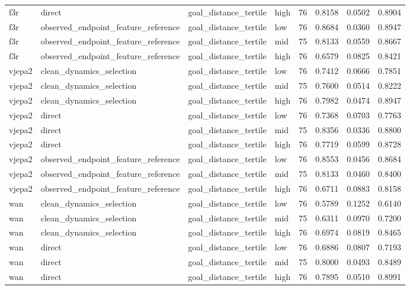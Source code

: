 \begin{tabular}{llllrrrr}
f3r & direct & goal\_distance\_tertile & high & 76 & 0.8158 & 0.0502 & 0.8904 \\
f3r & observed\_endpoint\_feature\_reference & goal\_distance\_tertile & low & 76 & 0.8684 & 0.0360 & 0.8947 \\
f3r & observed\_endpoint\_feature\_reference & goal\_distance\_tertile & mid & 75 & 0.8133 & 0.0559 & 0.8667 \\
f3r & observed\_endpoint\_feature\_reference & goal\_distance\_tertile & high & 76 & 0.6579 & 0.0825 & 0.8421 \\
vjepa2 & clean\_dynamics\_selection & goal\_distance\_tertile & low & 76 & 0.7412 & 0.0666 & 0.7851 \\
vjepa2 & clean\_dynamics\_selection & goal\_distance\_tertile & mid & 75 & 0.7600 & 0.0514 & 0.8222 \\
vjepa2 & clean\_dynamics\_selection & goal\_distance\_tertile & high & 76 & 0.7982 & 0.0474 & 0.8947 \\
vjepa2 & direct & goal\_distance\_tertile & low & 76 & 0.7368 & 0.0703 & 0.7763 \\
vjepa2 & direct & goal\_distance\_tertile & mid & 75 & 0.8356 & 0.0336 & 0.8800 \\
vjepa2 & direct & goal\_distance\_tertile & high & 76 & 0.7719 & 0.0599 & 0.8728 \\
vjepa2 & observed\_endpoint\_feature\_reference & goal\_distance\_tertile & low & 76 & 0.8553 & 0.0456 & 0.8684 \\
vjepa2 & observed\_endpoint\_feature\_reference & goal\_distance\_tertile & mid & 75 & 0.8133 & 0.0460 & 0.8400 \\
vjepa2 & observed\_endpoint\_feature\_reference & goal\_distance\_tertile & high & 76 & 0.6711 & 0.0883 & 0.8158 \\
wan & clean\_dynamics\_selection & goal\_distance\_tertile & low & 76 & 0.5789 & 0.1252 & 0.6140 \\
wan & clean\_dynamics\_selection & goal\_distance\_tertile & mid & 75 & 0.6311 & 0.0970 & 0.7200 \\
wan & clean\_dynamics\_selection & goal\_distance\_tertile & high & 76 & 0.6974 & 0.0819 & 0.8465 \\
wan & direct & goal\_distance\_tertile & low & 76 & 0.6886 & 0.0807 & 0.7193 \\
wan & direct & goal\_distance\_tertile & mid & 75 & 0.8000 & 0.0493 & 0.8489 \\
wan & direct & goal\_distance\_tertile & high & 76 & 0.7895 & 0.0510 & 0.8991 \\

\end{tabular}
